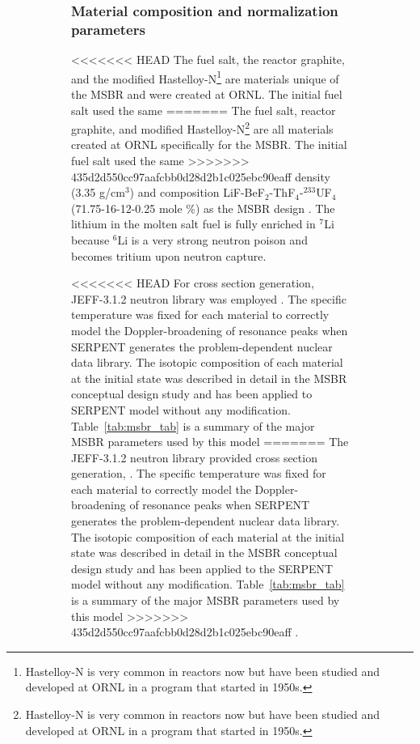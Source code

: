 \begin{figure}[t!]
\begin{figure}[ht!]
\subsubsection{Material composition and normalization parameters}
<<<<<<< HEAD
The fuel salt, the reactor graphite, and the modified Hastelloy-N\footnote{ 
Hastelloy-N is very common in reactors now but have been studied and developed 
at \gls{ORNL} in a program that started in 1950s.} are materials unique of the 
\gls{MSBR} and were created at \gls{ORNL}. The initial fuel salt used the same 
=======
The fuel salt, reactor graphite, and modified Hastelloy-N\footnote{ 
Hastelloy-N is very common in reactors now but have been studied and developed 
at \gls{ORNL} in a program that started in 1950s.} 
are all materials created at \gls{ORNL} specifically for the \gls{MSBR}.
The initial fuel salt used the same 
>>>>>>> 435d2d550cc97aafcbb0d28d2b1c025ebc90eaff
density (3.35 g/cm$^3$) and composition LiF-BeF$_2$-ThF$_4$-$^{233}$UF$_4$ 
(71.75-16-12-0.25 mole \%) as the \gls{MSBR} design 
\cite{robertson_conceptual_1971}. The lithium in the molten salt fuel is fully 
enriched in $^{7}$Li because $^{6}$Li is a very strong neutron poison and 
becomes tritium upon neutron capture. 

<<<<<<< HEAD
For cross section generation, JEFF-3.1.2 neutron library was employed 
\cite{oecd/nea_data_bank_jeff-3.1.2_2014}. The specific temperature was fixed 
for each material to correctly model the Doppler-broadening of resonance peaks 
when SERPENT generates the problem-dependent nuclear data library. The isotopic 
composition of each material at the initial state was described in detail in the 
MSBR conceptual design study \cite{robertson_conceptual_1971} and has been 
applied to SERPENT model without any modification. Table~\ref{tab:msbr_tab} is a 
summary of the major \gls{MSBR} parameters used by this model 
=======
The JEFF-3.1.2 neutron library provided cross section generation, 
\cite{oecd/nea_data_bank_jeff-3.1.2_2014}. 
The specific temperature was fixed 
for each material to correctly model the Doppler-broadening of resonance peaks 
when SERPENT generates the problem-dependent nuclear data library. The isotopic 
composition of each material at the initial state was described in detail in 
the MSBR conceptual design study \cite{robertson_conceptual_1971} and has been 
applied to the SERPENT model without any modification. Table~\ref{tab:msbr_tab} is 
a summary of the major \gls{MSBR} parameters used by this model 
>>>>>>> 435d2d550cc97aafcbb0d28d2b1c025ebc90eaff
\cite{robertson_conceptual_1971}. 


\end{figure}
\end{figure}

